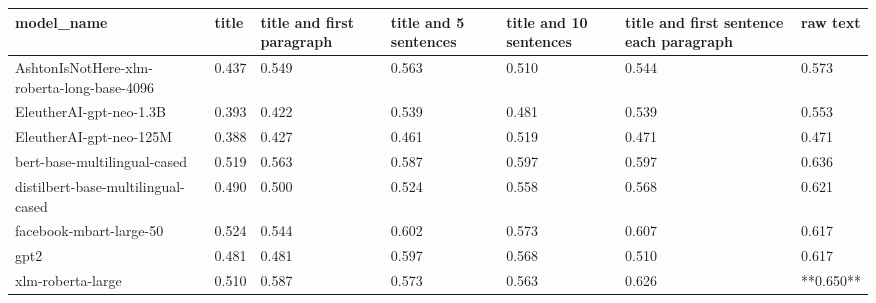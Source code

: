 \begin{tabular}{lllllll}
\toprule
                                model\_name & title & title and first paragraph & title and 5 sentences & title and 10 sentences & title and first sentence each paragraph &  raw text \\
\midrule
AshtonIsNotHere-xlm-roberta-long-base-4096 & 0.437 &                     0.549 &                 0.563 &                  0.510 &                                   0.544 &     0.573 \\
                   EleutherAI-gpt-neo-1.3B & 0.393 &                     0.422 &                 0.539 &                  0.481 &                                   0.539 &     0.553 \\
                   EleutherAI-gpt-neo-125M & 0.388 &                     0.427 &                 0.461 &                  0.519 &                                   0.471 &     0.471 \\
              bert-base-multilingual-cased & 0.519 &                     0.563 &                 0.587 &                  0.597 &                                   0.597 &     0.636 \\
        distilbert-base-multilingual-cased & 0.490 &                     0.500 &                 0.524 &                  0.558 &                                   0.568 &     0.621 \\
                   facebook-mbart-large-50 & 0.524 &                     0.544 &                 0.602 &                  0.573 &                                   0.607 &     0.617 \\
                                      gpt2 & 0.481 &                     0.481 &                 0.597 &                  0.568 &                                   0.510 &     0.617 \\
                         xlm-roberta-large & 0.510 &                     0.587 &                 0.573 &                  0.563 &                                   0.626 & **0.650** \\
\bottomrule
\end{tabular}
